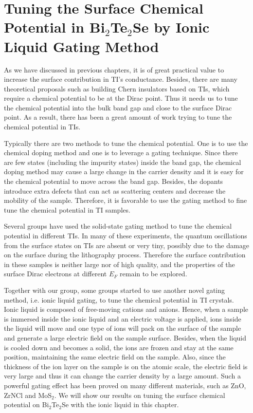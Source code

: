 
\chapter{Tuning the Surface Chemical Potential in Bi$_2$Te$_2$Se by Ionic Liquid Gating Method\label{ch:liquid}}

As we have discussed in previous chapters, it is of great practical value to increase the surface contribution in TI's conductance. Besides, there are many theoretical proposals such as building Chern insulators based on TIs, which require a chemical potential to be at the Dirac point. Thus it needs us to tune the chemical potential into the bulk band gap and close to the surface Dirac point. As a result, there has been a great amount of work trying to tune the chemical potential in TIs\cite{Checkelsky_gating, PabloBi2Se3, SacepeGate, PabloFilm, FuhrerBi2Se3, Checkelsky_liquid, IwasaMBE, Ando_liquid}.

Typically there are two methods to tune the chemical potential. One is to use the chemical doping method and one is to leverage a gating technique. Since there are few states (including the impurity states) inside the band gap, the chemical doping method may cause a large change in the carrier density and it is easy for the chemical potential to move across the band gap. Besides, the dopants introduce extra defects that can act as scattering centers and decrease the mobility of the sample. Therefore, it is favorable to use the gating method to fine tune the chemical potential in TI samples. 

Several groups\cite{Checkelsky_gating, PabloBi2Se3, SacepeGate, PabloFilm} have used the solid-state gating method to tune the chemical potential in different TIs. In many of these experiments, the quantum oscillations from the surface states on TIs are absent or very tiny, possibly due to the damage on the surface during the lithography process. Therefore the surface contribution in these samples is neither large nor of high quality, and the properties of the surface Dirac electrons at different $E_F$ remain to be explored.

Together with our group, some groups\cite{Yuan2011, FuhrerBi2Se3, Checkelsky_liquid, IwasaMBE, Ando_liquid} started to use another novel gating method, i.e. ionic liquid gating, to tune the chemical potential in TI crystals. Ionic liquid is composed of free-moving cations and anions. Hence, when a sample is immersed inside the ionic liquid and an electric voltage is applied, ions inside the liquid will move and one type of ions will pack on the surface of the sample and generate a large electric field on the sample surface. Besides, when the liquid is cooled down and becomes a solid, the ions are frozen and stay at the same position, maintaining the same electric field on the sample. Also, since the thickness of the ion layer on the sample is on the atomic scale, the electric field is very large and thus it can change the carrier density by a large amount. Such a powerful gating effect has been proved on many different materials, such as ZnO\cite{yuan2009ZnO}, ZrNCl\cite{ye2010liquid} and MoS$_2$\cite{YeMoS2}. We will show our results on tuning the surface chemical potential on Bi$_2$Te$_2$Se with the ionic liquid in this chapter.

